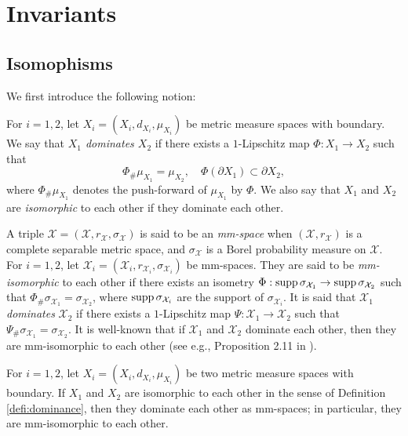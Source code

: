 \section{Invariants}\label{sec:Invariants}

\subsection{Isomophisms}
We first introduce the following notion:
\begin{defi}\label{defi:dominance}
For $i=1,2$,
let $X_{i}=(X_{i},d_{X_{i}},\mu_{X_{i}})$ be metric measure spaces with boundary.
We say that \textit{$X_{1}$ dominates $X_{2}$} if
there exists a $1$-Lipschitz map $\Phi:X_{1}\to X_{2}$ such that
\begin{equation}\label{eq:dominance}
\Phi_{\#}\mu_{X_{1}}=\mu_{X_{2}},\quad \Phi(\partial X_{1})\subset \partial X_{2},
\end{equation}
where $\Phi_{\#}\mu_{X_{1}}$ denotes the push-forward of $\mu_{X_{1}}$ by $\Phi$.
We also say that
$X_{1}$ and $X_{2}$ are \textit{isomorphic} to each other if
they dominate each other.
\end{defi}

\begin{rem}\label{rem:mm-spaces}
A triple $\mathcal{X}=(\mathcal{X},r_{\mathcal{X}},\sigma_{\mathcal{X}})$ is said to be an \textit{mm-space} when
$(\mathcal{X},r_{\mathcal{X}})$ is a complete separable metric space,
and $\sigma_{\mathcal{X}}$ is a Borel probability measure on $\mathcal{X}$.
For $i=1,2$,
let $\mathcal{X}_{i}=(\mathcal{X}_{i},r_{\mathcal{X}_{i}},\sigma_{\mathcal{X}_{i}})$ be mm-spaces.
They are said to be \textit{mm-isomorphic} to each other if 
there exists an isometry $\Phi:\mathrm{supp}\, \sigma_{\mathcal{X}_{1}}\to \mathrm{supp}\, \sigma_{\mathcal{X}_{2}}$ such that $\Phi_{\#}\sigma_{\mathcal{X}_{1}}=\sigma_{\mathcal{X}_{2}}$,
where $\mathrm{supp}\, \sigma_{\mathcal{X}_{i}}$ are the support of $\sigma_{\mathcal{X}_{i}}$.
It is said that
$\mathcal{X}_{1}$ \textit{dominates} $\mathcal{X}_{2}$ if
there exists a $1$-Lipschitz map $\Psi:\mathcal{X}_{1}\to \mathcal{X}_{2}$ such that $\Psi_{\#}\sigma_{\mathcal{X}_{1}}=\sigma_{\mathcal{X}_{2}}$.
It is well-known that
if $\mathcal{X}_{1}$ and $\mathcal{X}_{2}$ dominate each other,
then they are mm-isomorphic to each other (see e.g., Proposition 2.11 in \cite{Sh}).

For $i=1,2$,
let $X_{i}=(X_{i},d_{X_{i}},\mu_{X_{i}})$ be two metric measure spaces with boundary.
If $X_{1}$ and $X_{2}$ are isomorphic to each other in the sense of Definition \ref{defi:dominance},
then they dominate each other as mm-spaces;
in particular,
they are mm-isomorphic to each other.
\end{rem}

